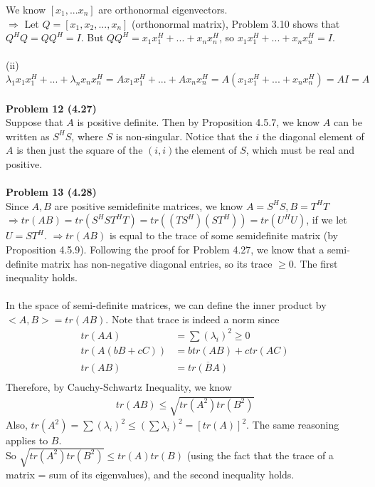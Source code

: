 \documentclass[letterpaper,12pt]{article}
\theoremstyle{definition}
\begin{document}
We know $[x_1, ... x_n]$ are orthonormal eigenvectors.\\
$\Rightarrow$ Let $Q = [x_1, x_2, ..., x_n]$ (orthonormal matrix), Problem 3.10 shows that $Q^HQ = QQ^H = I$. But $QQ^H = x_1x_1^H+ ... +x_nx_n^H$, so $x_1x_1^H+ ... +x_nx_n^H = I$.\\
\\
(ii)\\
$\lambda_1x_1x_1^H+...+\lambda_nx_nx_n^H = Ax_1x_1^H+...+Ax_nx_n^H = A(x_1x_1^H +... + x_nx_n^H) = AI = A$\\
\\
\noindent\textbf{Problem 12 (4.27)} \\
Suppose that $A$ is positive definite. Then by Proposition 4.5.7, we know $A$ can be written as $S^HS$, where $S$ is non-singular. Notice that the $i$ the diagonal element of $A$ is then just the square of the $(i, i )$the element of $S$, which must be real and positive.\\
\\
\noindent\textbf{Problem 13 (4.28)} \\
Since $A, B$ are positive semidefinite matrices, we know $A= S^HS, B = T^HT$\\
$\Rightarrow tr(AB) = tr(S^HST^HT) = tr((TS^H)(ST^H)) = tr(U^HU)$, if we let $U = ST^H$.
$\Rightarrow tr(AB)$ is equal to the trace of some semidefinite matrix (by Proposition 4.5.9). Following the proof for Problem 4.27, we know that a semi-definite matrix has non-negative diagonal entries, so its trace $\geq 0$. The first inequality holds.\\
\\
In the space of semi-definite matrices, we can define the inner product by $<A, B> = tr(AB)$. Note that trace is indeed a norm since\\
\begin{align*}
tr(AA) &= \sum(\lambda_i)^2 \geq 0\\
tr(A(bB+cC)) &= btr(AB) + ctr(AC)\\
tr(AB) &= \overline{tr(BA)}\\
\end{align*}
Therefore, by Cauchy-Schwartz Inequality, we know 
\begin{align*}
tr(AB) \leq \sqrt{tr(A^2)tr(B^2)}
\end{align*}
Also, $tr(A^2) = \sum(\lambda_i)^2 \leq (\sum\lambda_i)^2 = [tr(A)]^2.$ The same reasoning applies to $B$.\\
So $\sqrt{tr(A^2)tr(B^2)}\leq tr(A) tr(B)$ (using the fact that the trace of a matrix = sum of its eigenvalues), and the second inequality holds.\\
\end{document}
